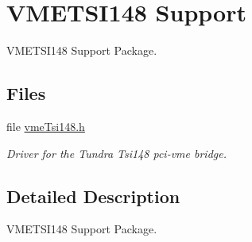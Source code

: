 \hypertarget{group__shared__vmetsi148}{}\section{V\+M\+E\+T\+S\+I148 Support}
\label{group__shared__vmetsi148}


V\+M\+E\+T\+S\+I148 Support Package.  


\subsection*{Files}
\begin{DoxyCompactItemize}
\item 
file \mbox{\hyperlink{vmeTsi148_8h}{vme\+Tsi148.\+h}}
\begin{DoxyCompactList}\small\item\em Driver for the Tundra Tsi148 pci-\/vme bridge. \end{DoxyCompactList}\end{DoxyCompactItemize}


\subsection{Detailed Description}
V\+M\+E\+T\+S\+I148 Support Package. 


